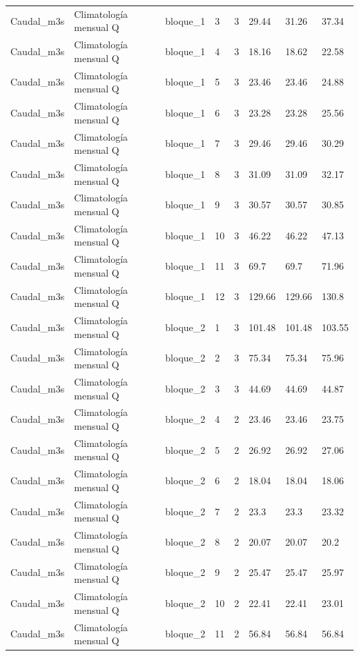\begin{longtable}{llllllll}
Caudal\_m3s & Climatología mensual Q & bloque\_1 & 3 & 3 & 29.44 & 31.26 & 37.34 \\
Caudal\_m3s & Climatología mensual Q & bloque\_1 & 4 & 3 & 18.16 & 18.62 & 22.58 \\
Caudal\_m3s & Climatología mensual Q & bloque\_1 & 5 & 3 & 23.46 & 23.46 & 24.88 \\
Caudal\_m3s & Climatología mensual Q & bloque\_1 & 6 & 3 & 23.28 & 23.28 & 25.56 \\
Caudal\_m3s & Climatología mensual Q & bloque\_1 & 7 & 3 & 29.46 & 29.46 & 30.29 \\
Caudal\_m3s & Climatología mensual Q & bloque\_1 & 8 & 3 & 31.09 & 31.09 & 32.17 \\
Caudal\_m3s & Climatología mensual Q & bloque\_1 & 9 & 3 & 30.57 & 30.57 & 30.85 \\
Caudal\_m3s & Climatología mensual Q & bloque\_1 & 10 & 3 & 46.22 & 46.22 & 47.13 \\
Caudal\_m3s & Climatología mensual Q & bloque\_1 & 11 & 3 & 69.7 & 69.7 & 71.96 \\
Caudal\_m3s & Climatología mensual Q & bloque\_1 & 12 & 3 & 129.66 & 129.66 & 130.8 \\
Caudal\_m3s & Climatología mensual Q & bloque\_2 & 1 & 3 & 101.48 & 101.48 & 103.55 \\
Caudal\_m3s & Climatología mensual Q & bloque\_2 & 2 & 3 & 75.34 & 75.34 & 75.96 \\
Caudal\_m3s & Climatología mensual Q & bloque\_2 & 3 & 3 & 44.69 & 44.69 & 44.87 \\
Caudal\_m3s & Climatología mensual Q & bloque\_2 & 4 & 2 & 23.46 & 23.46 & 23.75 \\
Caudal\_m3s & Climatología mensual Q & bloque\_2 & 5 & 2 & 26.92 & 26.92 & 27.06 \\
Caudal\_m3s & Climatología mensual Q & bloque\_2 & 6 & 2 & 18.04 & 18.04 & 18.06 \\
Caudal\_m3s & Climatología mensual Q & bloque\_2 & 7 & 2 & 23.3 & 23.3 & 23.32 \\
Caudal\_m3s & Climatología mensual Q & bloque\_2 & 8 & 2 & 20.07 & 20.07 & 20.2 \\
Caudal\_m3s & Climatología mensual Q & bloque\_2 & 9 & 2 & 25.47 & 25.47 & 25.97 \\
Caudal\_m3s & Climatología mensual Q & bloque\_2 & 10 & 2 & 22.41 & 22.41 & 23.01 \\
Caudal\_m3s & Climatología mensual Q & bloque\_2 & 11 & 2 & 56.84 & 56.84 & 56.84 \\

\end{longtable}
